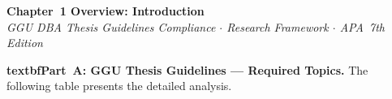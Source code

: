 
\thispagestyle{plain}

\begin{center}
{\large\bfseries\color{ggunavy} Chapter~1 Overview: Introduction}\\[0.2cm]
{\small\textit{GGU DBA Thesis Guidelines Compliance $\cdot$ Research Framework $\cdot$ APA~7th Edition}}
\end{center}

\vspace{0.3cm}

\noindent\textbf{textbfPart~A: GGU Thesis Guidelines --- Required Topics.} The following table presents the detailed analysis.

